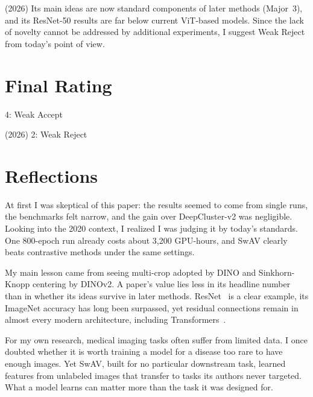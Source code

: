 \documentclass[10pt,twocolumn,letterpaper]{article}
\begin{document}
(2026) Its main ideas are now standard components of later methods (Major~3), and its ResNet-50 results are far below current ViT-based models. Since the lack of novelty cannot be addressed by additional experiments, I suggest Weak Reject from today's point of view.

\section{Final Rating}
4: Weak Accept

(2026) 2: Weak Reject

\section{Reflections}
At first I was skeptical of this paper: the results seemed to come from single runs, the benchmarks felt narrow, and the gain over DeepCluster-v2 was negligible. Looking into the 2020 context, I realized I was judging it by today's standards. One 800-epoch run already costs about 3{,}200 GPU-hours, and SwAV clearly beats contrastive methods under the same settings.

My main lesson came from seeing multi-crop adopted by DINO and Sinkhorn-Knopp centering by DINOv2. A paper's value lies less in its headline number than in whether its ideas survive in later methods. ResNet~\cite{he2016resnet} is a clear example, its ImageNet accuracy has long been surpassed, yet residual connections remain in almost every modern architecture, including Transformers~\cite{vaswani2017attention}.

For my own research, medical imaging tasks often suffer from limited data. I once doubted whether it is worth training a model for a disease too rare to have enough images. Yet SwAV, built for no particular downstream task, learned features from unlabeled images that transfer to tasks its authors never targeted. What a model learns can matter more than the task it was designed for.

{\small




}
\end{document}
